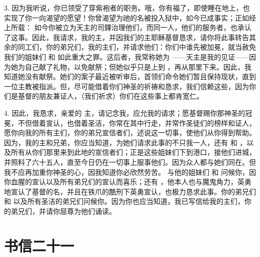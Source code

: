 3. 因为我听说，你已领受了穿紫袍者的职务。哦，你有福了，即使睡在地上，也实现了你一向渴望的愿望！你曾渴望为祂的名被投入狱中，如今已成事实；正如经上所载： 如今你被立为天主的司鐸治理他们，而同一人，他们的服务者，也承认了这事。因此，我请求，我的主，并因我们的主耶稣基督恳求，请你将此事转告其余的同工们，你的弟兄们，我的主们，并请求他们：你们中谁先被加冕，就当赦免我们的姐妹们  和  如此重大之罪。这后者，我常称她为 ——天主是我的见证——因为她为自己献了礼物，以免献祭；但她似乎只是上到 ，再从那里下来。因此，我知道她没有献祭。她们的案子最近被听审后，首领们命令她们暂且保持现状，直到一位主教被指派。但，尽可能借着你们神圣的祈祷和恳求，我们信赖这些，因为你们是基督的朋友兼证人，（我们祈求）你们在这些事上都肯宽仁。\par

4. 因此，我恳求，亲爱的  主，请记念我，应允我的请求；愿基督赐你那神圣的冠冕，不但借着宣认，也借着圣洁，你常在其中行走，并常作圣徒们的榜样和证人，愿你向我的所有主们，你的弟兄宣信者们，述说这一切事，使他们从你得到帮助。因为，我的主和兄弟，你应当知道，为她们请求此事的不只我一人，还有  和 ，以及所有从你们那里来到此地的宣信者们；正是这些姐妹们下到港口，接他们进城，并照料了六十五人，直至今日仍在一切事上服事他们。因为众人都与她们同在。但我不应再加重你神圣的心，因我知道你必欣然劳苦。 与他的姐妹们  和  问候你，因你血腥的宣认以及所有弟兄们的宣认而喜乐；还有 ，他本人也与魔鬼角力，英勇地宣认了基督的名，并且在铁爪的酷刑下英勇宣认，也极力恳求此事。你的弟兄们  和  以及所有圣洁的弟兄们问候你。因为你也应当知道，我已写信给我的主们，你的弟兄们，并请你屈尊为他们诵读。\par



\section{书信二十一}

\par

